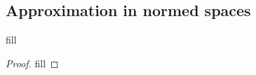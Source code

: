 \subsection{Approximation in normed spaces}

\begin{exercise}{1}
fill
\end{exercise}
\begin{proof}
fill
\end{proof}